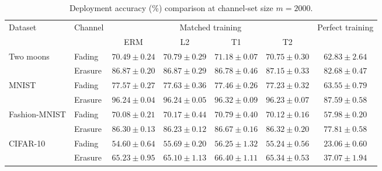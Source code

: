 \begin{table}[htb]
\centering
\caption{Deployment accuracy (\%) comparison at channel-set size $m=2000$.}
\label{tab:performance}
\begin{tabular*}{\linewidth}{@{\extracolsep{\fill}}llccccc@{}}
\toprule
\multirow{2}{*}{Dataset} & \multirow{2}{*}{Channel}
& \multicolumn{4}{c}{Matched training} & \multirow{2}{*}{Perfect training} \\
\cmidrule(lr){3-6}
& & ERM & L2 & T1 & T2 &  \\
\midrule
\multirow{2}{*}{Two moons}
& Fading
& $70.49\pm0.24$ & $70.79\pm0.29$ & $\mathbf{71.18}\pm0.07$ & $70.75\pm0.30$ & $62.83\pm2.64$ \\
& Erasure
& $86.87\pm0.20$ & $86.87\pm0.29$ & $86.78\pm0.46$ & $\mathbf{87.15}\pm0.33$ & $82.68\pm0.47$ \\
\midrule
\multirow{2}{*}{MNIST}
& Fading
& $77.57\pm0.27$ & $\mathbf{77.63}\pm0.36$ & $77.46\pm0.26$ & $77.23\pm0.32$ & $63.55\pm0.79$ \\
& Erasure
& $96.24\pm0.04$ & $96.24\pm0.05$ & $\mathbf{96.32}\pm0.09$ & $96.23\pm0.07$ & $87.59\pm0.58$ \\
\midrule
\multirow{2}{*}{Fashion-MNIST}
& Fading
& $70.08\pm0.21$ & $70.17\pm0.44$ & $\mathbf{70.79}\pm0.40$ & $70.12\pm0.16$ & $57.98\pm0.20$ \\
& Erasure
& $86.30\pm0.13$ & $86.23\pm0.12$ & $\mathbf{86.67}\pm0.16$ & $86.32\pm0.20$ & $77.81\pm0.58$ \\
\midrule
\multirow{2}{*}{CIFAR-10}
& Fading
& $54.60\pm0.64$ & $55.69\pm0.20$ & $\mathbf{56.25}\pm1.32$ & $55.24\pm0.56$ & $23.06\pm0.60$ \\
& Erasure
& $65.23\pm0.95$ & $65.10\pm1.13$ & $\mathbf{66.40}\pm1.11$ & $65.34\pm0.53$ & $37.07\pm1.94$ \\
\bottomrule
\end{tabular*}
\end{table}
